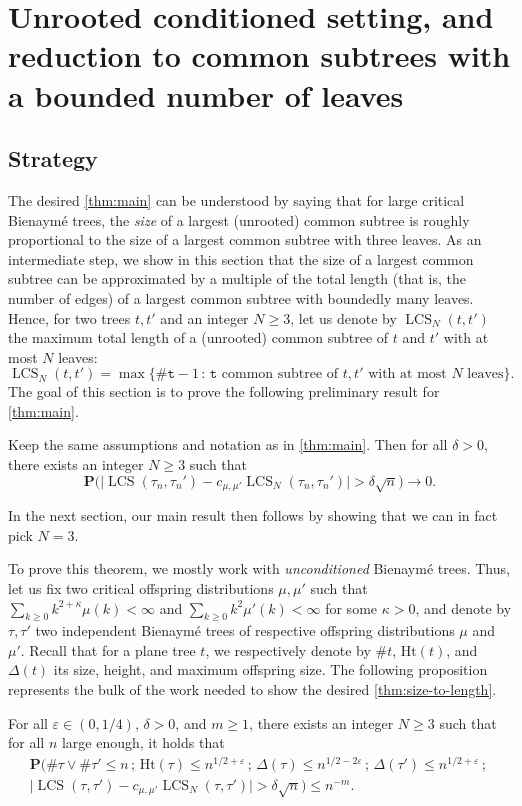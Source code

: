 \documentclass[11pt,reqno]{amsart}
\renewcommand{\P}{\mathbf{P}}
\newcommand{\1}{\mathbf{1}}
\newcommand{\0}{\mathbf{0}}
\newcommand{\ttt}{\mathtt{t}}
\newcommand{\Ht}{\mathrm{Ht}}
\newcommand{\LCS}{\operatorname{LCS}}
\begin{document}
\section{Unrooted conditioned setting, and reduction to common subtrees with a bounded number of leaves}\label{sec:Unrooted_LCS}

\subsection{Strategy}
The desired \cref{thm:main} can be understood by saying that for large critical Bienaymé trees, the \emph{size} of a largest (unrooted) common subtree is roughly proportional to the size of a largest common subtree with three leaves. As an intermediate step, we show in this section that the size of a largest common subtree can be approximated by a multiple of the total length (that is, the number of edges) of a largest common subtree with boundedly many leaves. Hence, for two trees $t,t'$ and an integer $N\geq 3$, let us denote by $\LCS_N(t,t')$ the maximum total length of a (unrooted) common subtree of $t$ and $t'$ with at most $N$ leaves: 
\begin{equation}
\label{expr_dscr_LCS_N}
\LCS_N(t,t')=\max\big\{\#\ttt -1 \, :\, \ttt \text{ common subtree of $t,t'$ with at most $N$ leaves} \big\}.
\end{equation}
The goal of this section is to prove the following preliminary result for \cref{thm:main}.
\begin{thm}
\label{thm:size-to-length}
Keep the same assumptions and notation as in \cref{thm:main}. Then for all $\delta>0$, there exists an integer $N\geq 3$ such that
\[\P\big(\big|\LCS(\tau_n,\tau_n')-c_{\mu,\mu'}\LCS_N(\tau_n,\tau_n')\big|>\delta\sqrt{n}\big)\to 0.\]
\end{thm}
In the next section, our main result then follows by showing that we can in fact pick $N=3$.

To prove this theorem, we mostly work with \emph{unconditioned} Bienaymé trees. Thus, let us fix two critical offspring distributions $\mu,\mu'$ such that $\sum_{k\geq 0}k^{2+\kappa}\mu(k)<\infty$ and $\sum_{k\geq 0}k^2\mu'(k)<\infty$ for some $\kappa>0$, and denote by $\tau,\tau'$ two independent Bienaymé trees of respective offspring distributions $\mu$ and $\mu'$. Recall that for a plane tree $t$, we respectively denote by $\#t$, $\Ht(t)$, and $\Delta(t)$ its size, height, and maximum offspring size. The following proposition represents the bulk of the work needed to show the desired \cref{thm:size-to-length}.
\begin{prop}
\label{prop:size-to-length_estimate}
For all $\varepsilon\in (0,1/4)$, $\delta>0$, and $m\geq 1$, there exists an integer $N\geq 3$ such that for all $n$ large enough, it holds that
\begin{multline*}
\P\big(\#\tau\vee\#\tau'\leq n\, ;\, \Ht(\tau)\leq n^{1/2+\varepsilon} \, ;\, \Delta(\tau)\leq n^{1/2-2\varepsilon}\, ;\, \Delta(\tau')\leq n^{1/2+\varepsilon}\, ;\,\\
\big|\LCS(\tau,\tau')-c_{\mu,\mu'}\LCS_N(\tau,\tau')\big|>\delta\sqrt{n}\big)\leq n^{-m}.
\end{multline*}
\end{prop}
\end{document}
